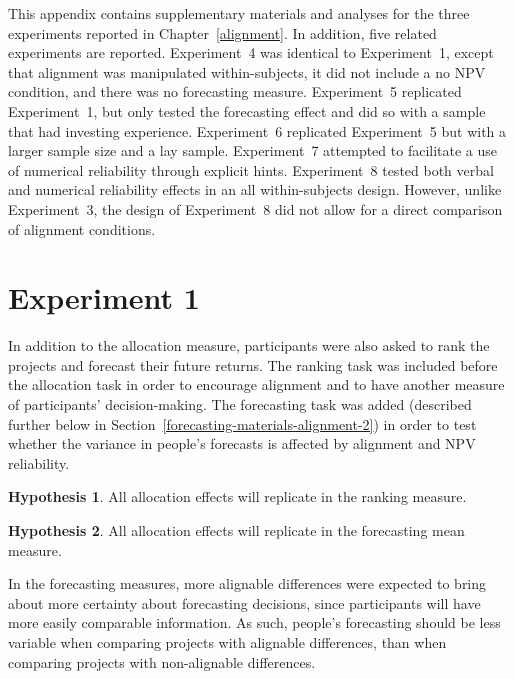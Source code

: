 \documentclass[a4paper, nobind, dvipsnames]{templates/ociamthesis}
\theoremstyle{definition}
\theoremstyle{definition}
\theoremstyle{definition}
\theoremstyle{definition}
\newtheorem{hypothesis}{Hypothesis}[chapter]
\theoremstyle{remark}
\begin{document}
\minitoc

This appendix contains supplementary materials and analyses for the three
experiments reported in Chapter~\ref{alignment}. In addition, five related
experiments are reported. Experiment~4 was identical to Experiment~1, except
that alignment was manipulated within-subjects, it did not include a no NPV
condition, and there was no forecasting measure. Experiment~5 replicated
Experiment~1, but only tested the forecasting effect and did so with a sample
that had investing experience. Experiment~6 replicated Experiment~5 but with a
larger sample size and a lay sample. Experiment~7 attempted to facilitate a use
of numerical reliability through explicit hints. Experiment~8 tested both verbal
and numerical reliability effects in an all within-subjects design. However,
unlike Experiment~3, the design of Experiment~8 did not allow for a direct
comparison of alignment conditions.

\hypertarget{alignment-2-appendix}{%
\section{Experiment 1}\label{alignment-2-appendix}}

In addition to the allocation measure, participants were also asked to rank the
projects and forecast their future returns. The ranking task was included before
the allocation task in order to encourage alignment and to have another measure
of participants' decision-making. The forecasting task was added (described
further below in Section~\ref{forecasting-materials-alignment-2}) in order to
test whether the variance in people's forecasts is affected by alignment and NPV
reliability.

\begin{hypothesis}
\protect\hypertarget{hyp:ranking-all-alignment-2}{}{\label{hyp:ranking-all-alignment-2} }All allocation effects will replicate in the ranking measure.
\end{hypothesis}

\begin{hypothesis}
\protect\hypertarget{hyp:forecasting-mean-all-alignment-2}{}{\label{hyp:forecasting-mean-all-alignment-2} }All allocation effects will replicate in the forecasting mean measure.
\end{hypothesis}

In the forecasting measures, more alignable differences were expected to bring
about more certainty about forecasting decisions, since participants will have
more easily comparable information. As such, people's forecasting should be less
variable when comparing projects with alignable differences, than when comparing
projects with non-alignable differences.
\end{document}
